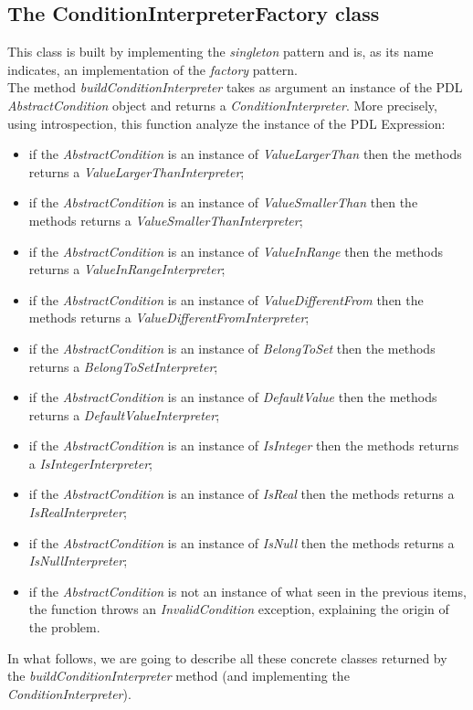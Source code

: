 \documentclass[a4paper,11pt] {ivoa}
\begin{document}
\subsection{The ConditionInterpreterFactory class}\label{conditionInterpreterFactory}
This class is built by implementing the {\it singleton} pattern and is, as its name indicates, an implementation of the {\it factory} pattern.\\
The method {\it buildConditionInterpreter} takes as argument an instance of the PDL {\it AbstractCondition} object and returns a {\it ConditionInterpreter}.
More precisely, using introspection, this function analyze the instance of the PDL Expression:
\begin{itemize}
\item if the {\it AbstractCondition} is an instance of {\it ValueLargerThan} then the methods returns a {\it ValueLargerThanInterpreter};
\item if the {\it AbstractCondition} is an instance of {\it ValueSmallerThan} then the methods returns a {\it ValueSmallerThanInterpreter};
\item if the {\it AbstractCondition} is an instance of {\it ValueInRange} then the methods returns a {\it ValueInRangeInterpreter};
\item if the {\it AbstractCondition} is an instance of {\it ValueDifferentFrom} then the methods returns a {\it ValueDifferentFromInterpreter};
\item if the {\it AbstractCondition} is an instance of {\it BelongToSet} then the methods returns a {\it BelongToSetInterpreter};
\item if the {\it AbstractCondition} is an instance of {\it DefaultValue} then the methods returns a {\it DefaultValueInterpreter};
\item if the {\it AbstractCondition} is an instance of {\it IsInteger} then the methods returns a {\it IsIntegerInterpreter};
\item if the {\it AbstractCondition} is an instance of {\it IsReal} then the methods returns a {\it IsRealInterpreter};
\item if the {\it AbstractCondition} is an instance of {\it IsNull} then the methods returns a {\it IsNullInterpreter};
\item if the {\it AbstractCondition} is not an instance of what seen in the previous items, the function throws an {\it InvalidCondition} exception, explaining the origin of the problem.
\end{itemize} 
In what follows, we are going to describe all these concrete classes returned by the  {\it buildConditionInterpreter} method (and implementing the {\it ConditionInterpreter}).
\end{document}
